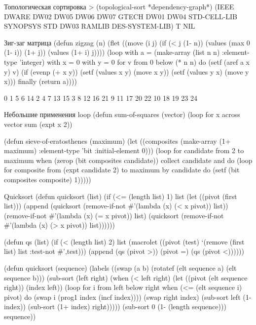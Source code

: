 \begin{cllst}{Топологическая сортировка}{}
> (topological-sort *dependency-graph*)
(IEEE DWARE DW02 DW05 DW06 DW07 GTECH DW01 DW04 STD-CELL-LIB SYNOPSYS STD DW03 RAMLIB DES-SYSTEM-LIB)
T
NIL
\end{cllst}

\begin{cllst}{Зиг-заг матрица}{}
(defun zigzag (n)
  (flet ((move (i j)
           (if (< j (1- n))
               (values (max 0 (1- i)) (1+ j))
               (values (1+ i) j))))
    (loop with a = (make-array (list n n) :element-type 'integer)
          with x = 0
          with y = 0
          for v from 0 below (* n n)
          do (setf (aref a x y) v)
             (if (evenp (+ x y))
                 (setf (values x y) (move x y))
                 (setf (values y x) (move y x)))
          finally (return a))))

 0  1  5  6 14
 2  4  7 13 15
 3  8 12 16 21
 9 11 17 20 22
10 18 19 23 24
\end{cllst}

\begin{cllst}{Небольшие применения loop}{}
(defun sum-of-squares (vector)
  (loop for x across vector sum (expt x 2))

(defun sieve-of-eratosthenes (maximum)
  (let ((composites (make-array (1+ maximum) :element-type 'bit
                                             :initial-element 0)))
    (loop for candidate from 2 to maximum
          when (zerop (bit composites candidate))
            collect candidate
            and do (loop for composite from (expt candidate 2) to maximum by candidate
                         do (setf (bit composites composite) 1)))))
\end{cllst}

\begin{cllst}{Quicksort}{}
(defun quicksort (list)
  (if (<= (length list) 1)
      list
      (let ((pivot (first list)))
	(append	(quicksort (remove-if-not #'(lambda (x) (< x pivot)) list))
			   (remove-if-not #'(lambda (x) (= x pivot)) list)
		(quicksort (remove-if-not #'(lambda (x) (> x pivot)) list))))))

(defun qs (list)
  (if (< (length list) 2)
      list
      (macrolet ((pivot (test) `(remove (first list) list :test-not #',test)))
        (append (qs (pivot >)) (pivot =) (qs (pivot <))))))

(defun quicksort (sequence)
  (labels ((swap (a b) (rotatef (elt sequence a) (elt sequence b)))
           (sub-sort (left right)
             (when (< left right)
               (let ((pivot (elt sequence right))
                     (index left))
                 (loop for i from left below right
                       when (<= (elt sequence i) pivot)
                         do (swap i (prog1 index (incf index))))
                 (swap right index)
                 (sub-sort left (1- index))
                 (sub-sort (1+ index) right)))))
    (sub-sort 0 (1- (length sequence)))
    sequence))
\end{cllst}

